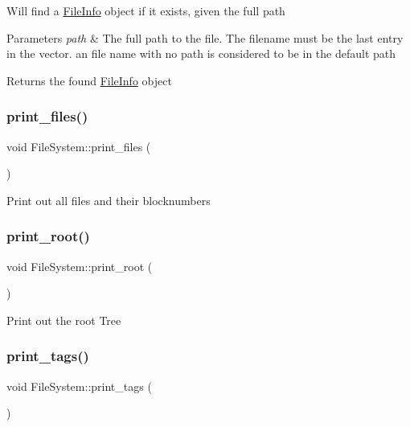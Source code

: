 Will find a \mbox{\hyperlink{classFileInfo}{File\+Info}} object if it exists, given the full path 
\begin{DoxyParams}{Parameters}
{\em path} & The full path to the file. The filename must be the last entry in the vector. an file name with no path is considered to be in the default path \\
\hline
\end{DoxyParams}
\begin{DoxyReturn}{Returns}
the found \mbox{\hyperlink{classFileInfo}{File\+Info}} object 
\end{DoxyReturn}
\mbox{\label{classFileSystem_a8d51e4c73c71d91d94ae91355f36bdb1}} 
\subsubsection{\texorpdfstring{print\+\_\+files()}{print\_files()}}
{\footnotesize\ttfamily void File\+System\+::print\+\_\+files (\begin{DoxyParamCaption}{ }\end{DoxyParamCaption})}

Print out all files and their blocknumbers \mbox{\label{classFileSystem_a8ec00d561e8d7510358618b249cc60d1}} 
\subsubsection{\texorpdfstring{print\+\_\+root()}{print\_root()}}
{\footnotesize\ttfamily void File\+System\+::print\+\_\+root (\begin{DoxyParamCaption}{ }\end{DoxyParamCaption})}

Print out the root Tree \mbox{\label{classFileSystem_ab76af13f044c3ca52e8503a9695685bd}} 
\subsubsection{\texorpdfstring{print\+\_\+tags()}{print\_tags()}}
{\footnotesize\ttfamily void File\+System\+::print\+\_\+tags (\begin{DoxyParamCaption}{ }\end{DoxyParamCaption})}

